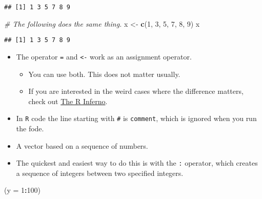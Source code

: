 \documentclass[]{book}
\newenvironment{Shaded}{\begin{snugshade}}{\end{snugshade}}
\newcommand{\CommentTok}[1]{\textcolor[rgb]{0.56,0.35,0.01}{\textit{#1}}}
\newcommand{\DataTypeTok}[1]{\textcolor[rgb]{0.13,0.29,0.53}{#1}}
\newcommand{\DecValTok}[1]{\textcolor[rgb]{0.00,0.00,0.81}{#1}}
\newcommand{\KeywordTok}[1]{\textcolor[rgb]{0.13,0.29,0.53}{\textbf{#1}}}
\newcommand{\NormalTok}[1]{#1}
\newcommand{\OperatorTok}[1]{\textcolor[rgb]{0.81,0.36,0.00}{\textbf{#1}}}
\newcommand{\StringTok}[1]{\textcolor[rgb]{0.31,0.60,0.02}{#1}}
\providecommand{\tightlist}{%
  \setlength{\itemsep}{0pt}\setlength{\parskip}{0pt}}
\begin{document}
\begin{verbatim}
## [1] 1 3 5 7 8 9
\end{verbatim}

\begin{Shaded}
\begin{Highlighting}[]
\CommentTok{# The following does the same thing.}
\NormalTok{x <-}\StringTok{ }\KeywordTok{c}\NormalTok{(}\DecValTok{1}\NormalTok{, }\DecValTok{3}\NormalTok{, }\DecValTok{5}\NormalTok{, }\DecValTok{7}\NormalTok{, }\DecValTok{8}\NormalTok{, }\DecValTok{9}\NormalTok{)}
\NormalTok{x}
\end{Highlighting}
\end{Shaded}

\begin{verbatim}
## [1] 1 3 5 7 8 9
\end{verbatim}

\begin{itemize}
\tightlist
\item
  The operator \texttt{=} and \texttt{\textless{}-} work as an assignment operator.

  \begin{itemize}
  \tightlist
  \item
    You can use both. This does not matter usually.
  \item
    If you are interested in the weird cases where the difference matters, check out \href{http://www.burns-stat.com/documents/books/the-r-inferno/}{The R Inferno}.
  \end{itemize}
\item
  In \texttt{R} code the line starting with \texttt{\#} is \texttt{comment}, which is ignored when you run the fode.
\end{itemize}

\begin{itemize}
\tightlist
\item
  A vector based on a sequence of numbers.
\item
  The quickest and easiest way to do this is with the \texttt{:} operator, which creates a sequence of integers between two specified integers.
\end{itemize}

\begin{Shaded}
\begin{Highlighting}[]
\NormalTok{(}\DataTypeTok{y =} \DecValTok{1}\OperatorTok{:}\DecValTok{100}\NormalTok{)}
\end{Highlighting}
\end{Shaded}
\end{document}

